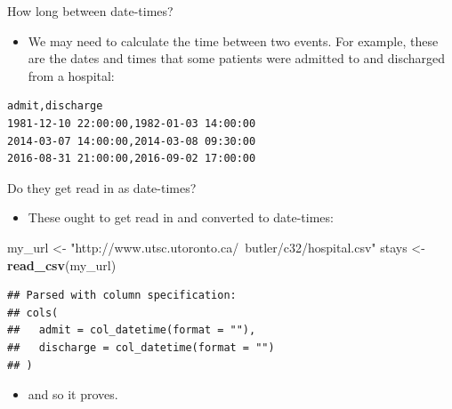 \documentclass[
  ignorenonframetext,
]{beamer}
\newenvironment{Shaded}{\begin{snugshade}}{\end{snugshade}}
\newcommand{\KeywordTok}[1]{\textcolor[rgb]{0.13,0.29,0.53}{\textbf{#1}}}
\newcommand{\NormalTok}[1]{#1}
\newcommand{\StringTok}[1]{\textcolor[rgb]{0.31,0.60,0.02}{#1}}
\providecommand{\tightlist}{%
  \setlength{\itemsep}{0pt}\setlength{\parskip}{0pt}}
\begin{document}
\begin{frame}[fragile]{How long between date-times?}
\protect\hypertarget{how-long-between-date-times}{}

\begin{itemize}
\tightlist
\item
  We may need to calculate the time between two events. For example,
  these are the dates and times that some patients were admitted to and
  discharged from a hospital:
\end{itemize}

\begin{verbatim}
admit,discharge
1981-12-10 22:00:00,1982-01-03 14:00:00
2014-03-07 14:00:00,2014-03-08 09:30:00
2016-08-31 21:00:00,2016-09-02 17:00:00
\end{verbatim}

\end{frame}

\begin{frame}[fragile]{Do they get read in as date-times?}
\protect\hypertarget{do-they-get-read-in-as-date-times}{}

\begin{itemize}
\tightlist
\item
  These ought to get read in and converted to date-times:
\end{itemize}

\begin{Shaded}
\begin{Highlighting}[]
\NormalTok{my_url <-}\StringTok{ "http://www.utsc.utoronto.ca/~butler/c32/hospital.csv"}
\NormalTok{stays <-}\StringTok{ }\KeywordTok{read_csv}\NormalTok{(my_url)}
\end{Highlighting}
\end{Shaded}

\begin{verbatim}
## Parsed with column specification:
## cols(
##   admit = col_datetime(format = ""),
##   discharge = col_datetime(format = "")
## )
\end{verbatim}

\begin{itemize}
\tightlist
\item
  and so it proves.
\end{itemize}

\end{frame}
\end{document}

